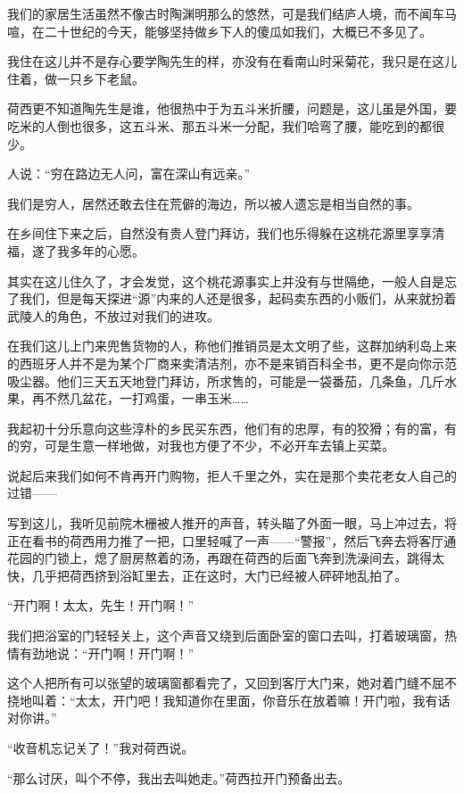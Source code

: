 \par 我们的家居生活虽然不像古时陶渊明那么的悠然，可是我们结庐人境，而不闻车马喧，在二十世纪的今天，能够坚持做乡下人的傻瓜如我们，大概已不多见了。
\par 我住在这儿并不是存心要学陶先生的样，亦没有在看南山时采菊花，我只是在这儿住着，做一只乡下老鼠。
\par 荷西更不知道陶先生是谁，他很热中于为五斗米折腰，问题是，这儿虽是外国，要吃米的人倒也很多，这五斗米、那五斗米一分配，我们哈弯了腰，能吃到的都很少。
\par 人说：“穷在路边无人问，富在深山有远亲。”
\par 我们是穷人，居然还敢去住在荒僻的海边，所以被人遗忘是相当自然的事。
\par 在乡间住下来之后，自然没有贵人登门拜访，我们也乐得躲在这桃花源里享享清福，遂了我多年的心愿。
\par 其实在这儿住久了，才会发觉，这个桃花源事实上并没有与世隔绝，一般人自是忘了我们，但是每天探进“源”内来的人还是很多，起码卖东西的小贩们，从来就扮着武陵人的角色，不放过对我们的进攻。
\par 在我们这儿上门来兜售货物的人，称他们推销员是太文明了些，这群加纳利岛上来的西班牙人并不是为某个厂商来卖清洁剂，亦不是来销百科全书，更不是向你示范吸尘器。他们三天五天地登门拜访，所求售的，可能是一袋番茄，几条鱼，几斤水果，再不然几盆花，一打鸡蛋，一串玉米……
\par 我起初十分乐意向这些淳朴的乡民买东西，他们有的忠厚，有的狡猾；有的富，有的穷，可是生意一样地做，对我也方便了不少，不必开车去镇上买菜。
\par 说起后来我们如何不肯再开门购物，拒人千里之外，实在是那个卖花老女人自己的过错——
\par 写到这儿，我听见前院木栅被人推开的声音，转头瞄了外面一眼，马上冲过去，将正在看书的荷西用力推了一把，口里轻喊了一声——“警报”，然后飞奔去将客厅通花园的门锁上，熄了厨房熬着的汤，再跟在荷西的后面飞奔到洗澡间去，跳得太快，几乎把荷西挤到浴缸里去，正在这时，大门已经被人砰砰地乱拍了。
\par “开门啊！太太，先生！开门啊！”
\par 我们把浴室的门轻轻关上，这个声音又绕到后面卧室的窗口去叫，打着玻璃窗，热情有劲地说：“开门啊！开门啊！”
\par 这个人把所有可以张望的玻璃窗都看完了，又回到客厅大门来，她对着门缝不屈不挠地叫着：“太太，开门吧！我知道你在里面，你音乐在放着嘛！开门啦，我有话对你讲。”
\par “收音机忘记关了！”我对荷西说。
\par “那么讨厌，叫个不停，我出去叫她走。”荷西拉开门预备出去。
